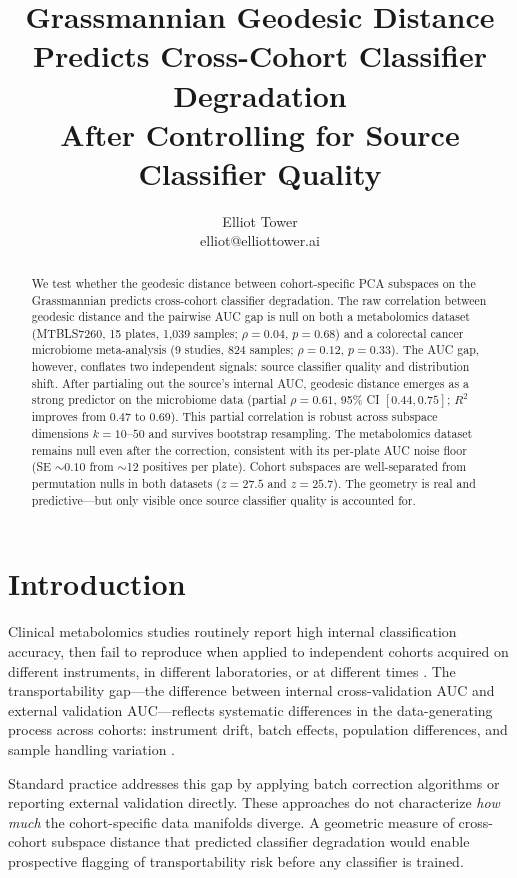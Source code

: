 \documentclass{article}
\title{Grassmannian Geodesic Distance Predicts Cross-Cohort Classifier Degradation\\After Controlling for Source Classifier Quality}
\author{\name Elliot Tower \\
      \email elliot@elliottower.ai}
\begin{document}
\maketitle

\begin{abstract}
We test whether the geodesic distance between cohort-specific PCA subspaces on the Grassmannian predicts cross-cohort classifier degradation. The raw correlation between geodesic distance and the pairwise AUC gap is null on both a metabolomics dataset (MTBLS7260, 15 plates, 1{,}039 samples; $\rho = 0.04$, $p = 0.68$) and a colorectal cancer microbiome meta-analysis (9 studies, 824 samples; $\rho = 0.12$, $p = 0.33$). The AUC gap, however, conflates two independent signals: source classifier quality and distribution shift. After partialing out the source's internal AUC, geodesic distance emerges as a strong predictor on the microbiome data (partial $\rho = 0.61$, 95\% CI $[0.44, 0.75]$; $R^2$ improves from 0.47 to 0.69). This partial correlation is robust across subspace dimensions $k = 10$--$50$ and survives bootstrap resampling. The metabolomics dataset remains null even after the correction, consistent with its per-plate AUC noise floor (SE $\sim 0.10$ from $\sim$12 positives per plate). Cohort subspaces are well-separated from permutation nulls in both datasets ($z = 27.5$ and $z = 25.7$). The geometry is real and predictive---but only visible once source classifier quality is accounted for.
\end{abstract}

\section{Introduction}

Clinical metabolomics studies routinely report high internal classification accuracy, then fail to reproduce when applied to independent cohorts acquired on different instruments, in different laboratories, or at different times \citep{broadhurst2006statistical}. The transportability gap---the difference between internal cross-validation AUC and external validation AUC---reflects systematic differences in the data-generating process across cohorts: instrument drift, batch effects, population differences, and sample handling variation \citep{wehrens2016improved}.

Standard practice addresses this gap by applying batch correction algorithms \citep{johnson2007adjusting} or reporting external validation directly. These approaches do not characterize \emph{how much} the cohort-specific data manifolds diverge. A geometric measure of cross-cohort subspace distance that predicted classifier degradation would enable prospective flagging of transportability risk before any classifier is trained.
\end{document}
